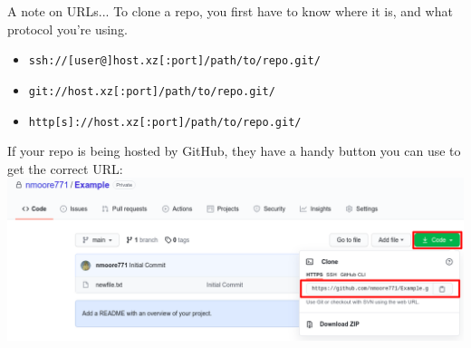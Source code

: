 \documentclass[11pt]{beamer}
\begin{document}
\begin{frame}{A note on URLs...}
To clone a repo, you first have to know where it is, and what protocol you're using.
\begin{itemize}
\item \texttt{ssh://[user@]host.xz[:port]/path/to/repo.git/}
\item \texttt{git://host.xz[:port]/path/to/repo.git/}
\item \texttt{http[s]://host.xz[:port]/path/to/repo.git/}
\end{itemize}
If your repo is being hosted by GitHub, they have a handy button you can use to get the correct URL:
\center
\includegraphics[scale=0.25]{github.png}
\end{frame}
\end{document}
